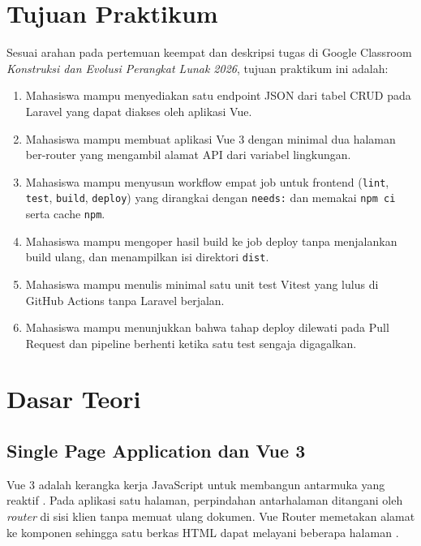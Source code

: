 \documentclass[a4paper,oneside,12pt]{report}
\begin{document}
\setcounter{page}{3}

\chapter[Tujuan Praktikum]{Tujuan Praktikum}
Sesuai arahan pada pertemuan keempat dan deskripsi tugas di Google Classroom \textit{Konstruksi dan Evolusi Perangkat Lunak 2026}, tujuan praktikum ini adalah:
\begin{enumerate}
   \item Mahasiswa mampu menyediakan satu endpoint JSON dari tabel CRUD pada Laravel yang dapat diakses oleh aplikasi Vue.
   \item Mahasiswa mampu membuat aplikasi Vue 3 dengan minimal dua halaman ber-router yang mengambil alamat API dari variabel lingkungan.
   \item Mahasiswa mampu menyusun workflow empat job untuk frontend (\texttt{lint}, \texttt{test}, \texttt{build}, \texttt{deploy}) yang dirangkai dengan \texttt{needs:} dan memakai \texttt{npm ci} serta cache \texttt{npm}.
   \item Mahasiswa mampu mengoper hasil build ke job deploy tanpa menjalankan build ulang, dan menampilkan isi direktori \texttt{dist}.
   \item Mahasiswa mampu menulis minimal satu unit test Vitest yang lulus di GitHub Actions tanpa Laravel berjalan.
   \item Mahasiswa mampu menunjukkan bahwa tahap deploy dilewati pada Pull Request dan pipeline berhenti ketika satu test sengaja digagalkan.
\end{enumerate}

\clearpage

\chapter{Dasar Teori}

\section{Single Page Application dan Vue 3}
Vue 3 adalah kerangka kerja JavaScript untuk membangun antarmuka yang reaktif \cite{vue-docs}. Pada aplikasi satu halaman, perpindahan antarhalaman ditangani oleh \textit{router} di sisi klien tanpa memuat ulang dokumen. Vue Router memetakan alamat ke komponen sehingga satu berkas HTML dapat melayani beberapa halaman \cite{vue-router}.
\end{document}
